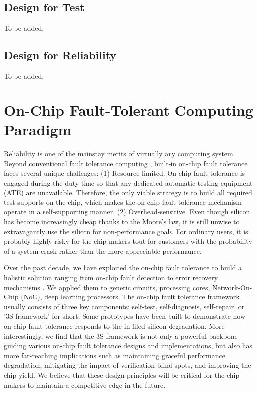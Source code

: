 \subsection{Design for Test}
To be added.

\subsection{Design for Reliability}
To be added.

\section{On-Chip Fault-Tolerant Computing Paradigm}
Reliability is one of the mainstay merits of virtually any computing system. Beyond conventional fault tolerance computing \cite{degradation_05}, built-in on-chip fault tolerance faces several unique challenges: (1) Resource limited. On-chip fault tolerance is engaged during the duty time so that any dedicated automatic testing equipment (ATE) are unavailable. Therefore, the only viable strategy is to build all required test supports on the chip, which makes the on-chip fault tolerance mechanism operate in a self-supporting manner. (2) Overhead-sensitive. Even though silicon has become increasingly cheap thanks to the Moore's law, it is still unwise to extravagantly use the silicon for non-performance goals. For ordinary users, it is probably highly risky for the chip makers tout for customers with the probability of a system crash rather than the more appreciable performance.

Over the past decade, we have exploited the on-chip fault tolerance to build a holistic solution ranging from on-chip fault detection to error recovery mechanisms \cite{ReviveNet, fu2011abacus,  yan2015corerank, yan2010svfd, zhang2009topology, han2013revivepath, liu2021hyca}. We applied them to generic circuits, processing cores, Network-On-Chip
(NoC), deep learning processors. The on-chip fault tolerance framework usually consists of three key components: self-test, self-diagnosis, self-repair, or '3S framework' for short. Some prototypes have been built to demonstrate how on-chip fault tolerance responds to the in-filed silicon degradation. More interestingly, we find that the 3S framework is not only a powerful backbone guiding various on-chip fault tolerance designs and implementations, but also has more far-reaching implications such as maintaining graceful performance degradation, mitigating the impact of verification blind spots, and improving the chip yield. We believe that these design principles will be critical for the chip makers to maintain a competitive edge in the future.

